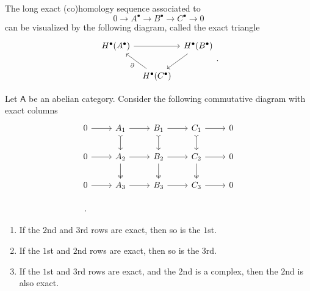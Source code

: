 \begin{rem}[Notation]
	The long exact (co)homology sequence associated to
	\begin{equation}
	0 \to A^\bullet \to B^\bullet \to C^\bullet \to 0
	\end{equation} 
	can be visualized by the following diagram, called the exact triangle
	\begin{equation}
	\begin{tikzcd}[column sep=tiny]
		H^{\bullet}(A^\bullet) \arrow[rr, "", rightarrow] & &
		H^{\bullet}(B^\bullet) \arrow[dl, "", rightarrow] \\
		&
		H^{\bullet}(C^\bullet) \arrow[lu, "\partial", rightarrow] &
	\end{tikzcd}
	.\end{equation} 
\end{rem}

\begin{lem}
	Let $\mathsf{A}$ be an abelian category.
	Consider the following commutative diagram with exact columns
	\begin{equation}
	\begin{tikzcd}
		0 \arrow[r, "", rightarrow] &
		A_1 \arrow[r, "", rightarrow] \arrow[d, "", tail] &
		B_1 \arrow[r, "", rightarrow] \arrow[d, "", tail] &
		C_1 \arrow[r, "", rightarrow] \arrow[d, "", tail] &
		0 \\
		0 \arrow[r, "", rightarrow] &
		A_2 \arrow[r, "", rightarrow] \arrow[d, "", two heads] &
		B_2 \arrow[r, "", rightarrow] \arrow[d, "", two heads] &
		C_2 \arrow[r, "", rightarrow] \arrow[d, "", two heads] &
		0 \\
		0 \arrow[r, "", rightarrow] &
		A_3 \arrow[r, "", rightarrow] &
		B_3 \arrow[r, "", rightarrow] &
		C_3 \arrow[r, "", rightarrow] &
		0 \\
	.\end{tikzcd}
	\end{equation} 
	\begin{enumerate}
		\item If the $2$nd and $3$rd rows are exact, then so is the $1$st.
		\item If the $1$st and $2$nd rows are exact, then so is the $3$rd.
		\item If the $1$st and $3$rd rows are exact, and the $2$nd is a complex,
			then the $2$nd is also exact.
	\end{enumerate}
\end{lem} 

